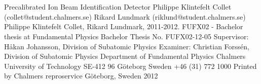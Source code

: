 \section*{}
{
\large
Precalibrated Ion Beam Identification Detector\newline
Philippe Klintefelt Collet (collet@student.chalmers.se)\newline
Rikard Lundmark (riklund@student.chalmers.se)
\newline
\newline
\textcopyright Philippe Klintefelt Collet, Rikard Lundmark, 2011-2012.
\newline
\newline
FUFX02 - Bachelor thesis at Fundamental Physics\newline
Bachelor Thesis No. FUFX02-12-05
\newline
\newline
Supervisor: Håkan Johansson, Division of Subatomic Physics\newline
Examiner: Christian Forssén, Division of Subatomic Physics
\newline
\newline
Department of Fundamental Physics\newline
Chalmers University of Technology\newline
SE-412 96 Göteborg\newline
Sweden\newline
+46 (31) 772 1000
\newline
\newline
Printed by Chalmers reproservice \newline
Göteborg, Sweden 2012
}
